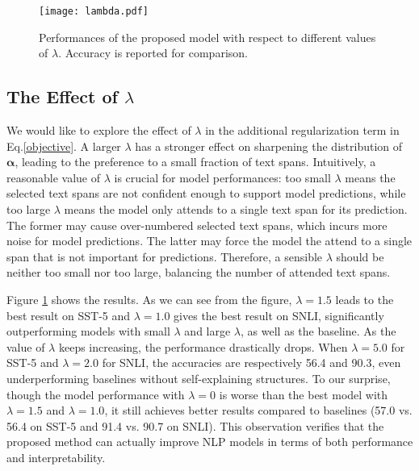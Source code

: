 \documentclass[11pt,a4paper]{article}
\begin{document}
\begin{figure}
  \centering
  \texttt{[image: lambda.pdf]}
  \caption{Performances of the proposed model with respect to different values of $\lambda$. Accuracy is reported for comparison.}
  \label{fig:lambda}
\end{figure}


\subsection{The Effect of $\lambda$}
We would like to explore the effect of $\lambda$ in the additional regularization term in Eq.\ref{objective}. A larger $\lambda$ has a stronger effect on sharpening the distribution of $\bm{\alpha}$, leading to the preference to a small fraction of text spans. Intuitively, a reasonable value of $\lambda$ is crucial for model performances: too small $\lambda$  means the selected text spans are not confident enough to support model predictions, while too large $\lambda$ means the model only attends to a single text span for its prediction. The former may cause  over-numbered selected text spans, which incurs more noise for model predictions. The latter may force the model the attend to a single span that is not important for predictions. Therefore, a sensible $\lambda$ should be neither too small nor too large, balancing the number of attended text spans.

Figure \ref{fig:lambda} shows the results. As we can see from the figure, $\lambda=1.5$ leads to the best result on SST-5 and $\lambda=1.0$ gives the best result on SNLI, significantly outperforming models with small $\lambda$ and large $\lambda$, as well as the baseline. As the value of $\lambda$ keeps increasing, the performance drastically drops. When $\lambda=5.0$ for SST-5 and $\lambda=2.0$ for SNLI, the accuracies are respectively 56.4 and 90.3, even underperforming baselines without self-explaining structures. 
To our surprise, though the model performance with $\lambda=0$ is worse than the best model with $\lambda=1.5$ and $\lambda=1.0$, it still achieves better results compared to baselines (57.0 vs. 56.4 on SST-5 and 91.4 vs. 90.7 on SNLI). This observation verifies that the proposed method can actually improve NLP models in terms of both performance and interpretability.
\end{document}
